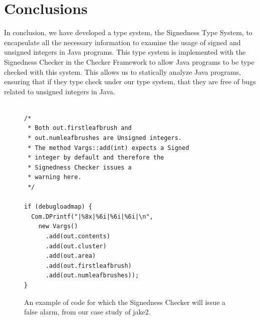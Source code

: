 \documentclass{sig-alternate-05-2015}
\begin{document}
\section{Conclusions}

In conclusion, we have developed a type system, the Signedness Type System, to
encapsulate all the necessary information to examine the usage of signed and unsigned
integers in Java programs. This type system is implemented with the Signedness
Checker in the Checker Framework to allow Java programs to be type checked with this
system. This allows us to statically analyze Java programs, ensuring that if they
type check under our type system, that they are free of bugs related to unsigned
integers in Java.

\begin{figure}
\begin{lstlisting}

/*
 * Both out.firstleafbrush and
 * out.numleafbrushes are Unsigned integers.
 * The method Vargs::add(int) expects a Signed
 * integer by default and therefore the
 * Signedness Checker issues a
 * warning here.
 */

if (debugloadmap) {
  Com.DPrintf("|%8x|%6i|%6i|%6i|\n",
    new Vargs()
      .add(out.contents)
      .add(out.cluster)
      .add(out.area)
      .add(out.firstleafbrush)
      .add(out.numleafbrushes));
}

\end{lstlisting}
\vspace{-10pt}
\caption{An example of code for which the Signedness Checker will issue a false
alarm, from our case study of jake2.}
\label{fig:bug}
\end{figure}



\end{document}
